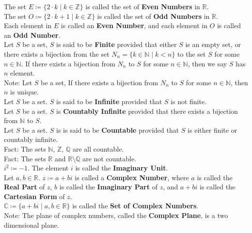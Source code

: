 \documentclass[11pt]{article}
\newcommand{\R}{\mathbb{R}}
\newcommand{\N}{\mathbb{N}}
\newcommand{\Z}{\mathbb{Z}}
\newcommand{\Q}{\mathbb{Q}}
\newcommand{\Complex}{\mathbb{C}}
\newcommand{\note}{\color{gray}Note: \color{black}}
\newcommand{\fact}{\color{gray}Fact: \color{black}}
\begin{document}
		\noindent The set $E \coloneqq \{ 2 \cdot k \mid k \in \Z \}$ is called the set of \textbf{Even Numbers} in $\R$.\\ The set $O \coloneqq \{ 2 \cdot k+1 \mid k \in \Z \}$ is called the set of \textbf{Odd Numbers} in $\R$.\\ Each element in $E$ is called an \textbf{Even Number}, and each element in $O$ is called an \textbf{Odd Number}.\\
		
		\noindent Let $S$ be a set, $S$ is said to be \textbf{Finite} provided that either $S$ is an empty set, or there exists a bijection from the set $N_n = \{ k \in \N \mid k<n \}$ to the set $S$ for some $n \in \N$. If there exists a bijection from $N_n$ to $S$ for some $n \in \N$, then we say $S$ has $n$ element.\\
		\note Let $S$ be a set, If there exists a bijection from $N_n$ to $S$ for some $n \in \N$, then $n$ is unique.\\
		
		\noindent Let $S$ be a set. $S$ is said to be \textbf{Infinite} provided that $S$ is not finite.\\		
		
		\noindent Let $S$ be a set. $S$ is \textbf{Countably Infinite} provided that there exists a bijection from $\N$ to $S$.\\
		
		\noindent Let $S$ be a set. $S$ is is said to be \textbf{Countable} provided that $S$ is either finite or countably infinite.\\
		\fact The sets $\N$, $\Z$, $\Q$ are all countable.\\
		\fact The sets $\R$ and $\R \setminus \Q$ are not countable.\\
		
		
		
		
		
		
		
		
		
		
		\noindent $i^2 \coloneqq -1$. The element $i$ is called the \textbf{Imaginary Unit}.\\
		
		\noindent Let $a,b \in \R$. $z \coloneqq a+bi$ is called a \textbf{Complex Number}, where $a$ is called the \textbf{Real Part} of $z$, $b$ is called the \textbf{Imaginary Part} of $z$, and $a+bi$ is called the \textbf{Cartesian Form} of $z$.\\ 
		
		\noindent $\Complex \coloneqq \{ a+bi \mid a,b \in \R \} $ is called the \textbf{Set of Complex Numbers}.\\
		\note The plane of complex numbers, called the \textbf{Complex Plane}, is a two dimensional plane.\\
		
\end{document}
